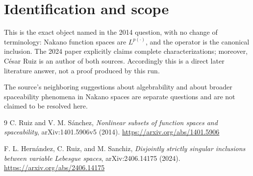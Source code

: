 \documentclass[11pt]{article}
\begin{document}
\section*{Identification and scope}

This is the exact object named in the 2014 question, with no change of
terminology: Nakano function spaces are $L^{p(\cdot)}$, and the operator is
the canonical inclusion.  The 2024 paper explicitly claims complete
characterizations; moreover, C\'esar Ruiz is an author of both sources.
Accordingly this is a direct later literature answer, not a proof produced by
this run.

The source's neighboring suggestions about algebrability and about broader
spaceability phenomena in Nakano spaces are separate questions and are not
claimed to be resolved here.

\begin{thebibliography}{9}
C. Ruiz and V. M. S\'anchez,
\emph{Nonlinear subsets of function spaces and spaceability},
arXiv:1401.5906v5 (2014).
\url{https://arxiv.org/abs/1401.5906}

F. L. Hern\'andez, C. Ruiz, and M. Sanchiz,
\emph{Disjointly strictly singular inclusions between variable Lebesgue
spaces}, arXiv:2406.14175 (2024).
\url{https://arxiv.org/abs/2406.14175}
\end{thebibliography}
\end{document}
